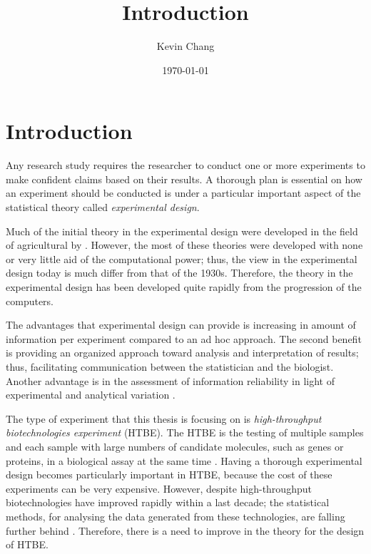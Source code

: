 \documentclass[11pt,a4paper]{article}
\begin{document}
\title{Introduction}
\author{Kevin Chang}
\date{\today}
\maketitle


\section{Introduction}
Any research study requires the researcher to conduct one or more experiments to make confident claims based on their results. A thorough plan is essential on how an experiment should be conducted is under a particular important aspect of the statistical theory called \emph{experimental design}. 

Much of the initial theory in the experimental design were developed in the field of agricultural by \citep{Fisher1935}. However, the most of these theories were developed with none or very little aid of the computational power; thus, the view in the experimental design today is much differ from that of the 1930s. Therefore, the theory in the experimental design has been developed quite rapidly from the progression of the computers. 
 
The advantages that experimental design can provide is increasing in amount of information per experiment compared to an ad hoc approach. The second benefit is providing an organized approach toward analysis and interpretation of results; thus, facilitating communication between the statistician and the biologist. Another advantage is in the assessment of information reliability in light of experimental and analytical variation \citep{Doyle2009}. 

The type of experiment that this thesis is focusing on is \emph{high-throughput biotechnologies experiment} (HTBE). The HTBE is the testing of multiple samples and each sample with large numbers of candidate molecules, such as genes or proteins, in a biological assay at the same time \citep{Janzen2002}. Having a thorough experimental design becomes particularly important in HTBE, because the cost of these experiments can be very expensive. However, despite high-throughput biotechnologies have improved rapidly within a last decade; the statistical methods, for analysing the data generated from these technologies, are falling further behind \citep{Doyle2009}. Therefore, there is a need to improve in the theory for the design of HTBE. 
\end{document}
